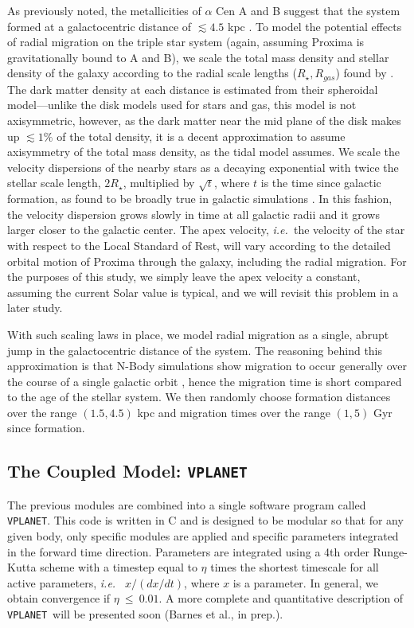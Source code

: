 \documentclass[preprint,12pt]{aastex}
\def\ie{{\it i.e.\ }}
\def\vplanet{\texttt{\footnotesize{VPLANET}}\xspace}
\begin{document}
As previously noted, the metallicities of $\alpha$ Cen A and B 
suggest that the system formed at a galactocentric distance of 
$\lesssim 4.5$ kpc \citep{Loebman16}. To model the potential 
effects of radial migration on the triple star system (again, 
assuming Proxima is gravitationally bound to A and B), we 
scale the total mass density and stellar density of the galaxy 
according to the radial scale lengths ($R_{\star}, R_{gas}$) found
by \cite{Kordopatis15}. The dark matter density at each distance 
is estimated from their spheroidal model---unlike the disk models 
used for stars and gas, this model is not axisymmetric, however, 
as the dark matter near the mid plane of the disk makes up 
$\lesssim 1\%$ of the total density, it is a decent approximation 
to assume axisymmetry of the total mass density, as the 
\cite{Heisler1986} tidal model assumes. We scale the velocity 
dispersions of the nearby stars as a decaying exponential 
with twice the stellar scale length, $2R_{\star}$, multiplied by 
$\sqrt{t}$, where $t$ is the time since galactic formation, as found 
to be broadly true in galactic simulations 
\citep{Minchev2012, Roskar2012}. In this fashion, the velocity 
dispersion grows slowly in time at all galactic radii and it grows 
larger closer to the galactic center.
The apex velocity, \ie the velocity of the star with respect to
the Local Standard of Rest, will vary according to the detailed
orbital motion
of Proxima through the galaxy, including the radial migration.  For the
purposes of this study, we
simply leave the apex velocity a constant, assuming the current Solar
value is typical, and we will revisit this problem in a later study.

With such scaling laws in place, we model radial migration 
as a single, abrupt jump in the galactocentric distance of the 
system. The reasoning behind this approximation is that N-Body 
simulations show migration to occur generally over the 
course of a single galactic orbit \cite{Roskar2010}, hence the 
migration time is short compared to the age of the stellar system.
We then randomly choose formation distances over the range 
$(1.5,4.5)$ kpc and migration times over the range $(1,5)$ Gyr 
since formation.

\subsection{The Coupled Model: \vplanet}
\label{sec:models:vplanet}
The previous modules are combined into a single software program
called \vplanet. This code is written in C and is designed to be
modular so that for any given body, only specific modules are applied
and specific parameters integrated in the forward time direction. 
Parameters are integrated
using a 4th order Runge-Kutta scheme with a timestep equal to $\eta$
times the shortest timescale for all active parameters, \ie
$x/(dx/dt)$, where $x$ is a parameter. In general, we obtain convergence if
$\eta~\le~0.01$. A more complete and quantitative description of
\vplanet~will be presented soon (Barnes et al., in prep.). 
\end{document}
